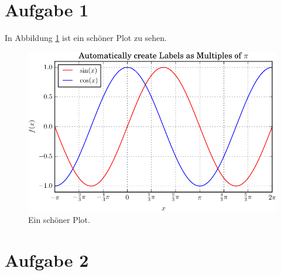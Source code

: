 \documentclass{scrartcl}
\begin{document}
\section*{Aufgabe 1}

In Abbildung \ref{fig:plot1} ist ein schöner Plot zu sehen.
\blindtext
\begin{figure}
  \centering
  \includegraphics[scale=1]{plot1.pdf}
  \caption{Ein schöner Plot.}
  \label{fig:plot1}
\end{figure}
\blindtext

\section*{Aufgabe 2}
\end{document}
